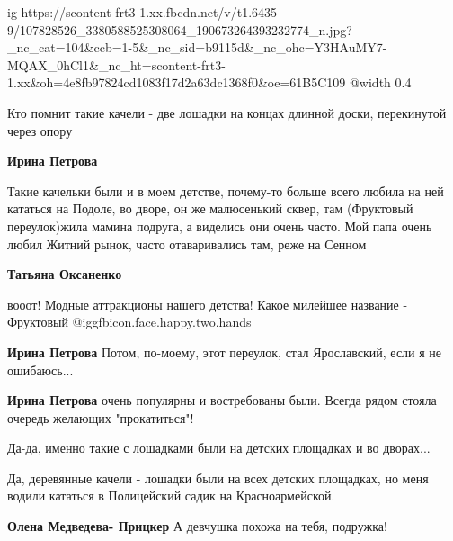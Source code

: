  
 
 
 
 

\ifcmt
  ig https://scontent-frt3-1.xx.fbcdn.net/v/t1.6435-9/107828526_3380588525308064_190673264393232774_n.jpg?_nc_cat=104&ccb=1-5&_nc_sid=b9115d&_nc_ohc=Y3HAuMY7-MQAX_0hCl1&_nc_ht=scontent-frt3-1.xx&oh=4e8fb97824cd1083f17d2a63dc1368f0&oe=61B5C109
  @width 0.4
\fi


Кто помнит такие качели - две лошадки на концах длинной доски, перекинутой
через опору

\textbf{Ирина Петрова} 

Такие качельки были и в моем детстве, почему-то больше всего любила на ней
кататься на Подоле, во дворе, он же малюсенький сквер, там (Фруктовый
переулок)жила мамина подруга, а виделись они очень часто. Мой папа очень любил
Житний рынок, часто отаваривались там, реже на Сенном

\textbf{Татьяна Оксаненко} 

вооот! Модные аттракционы нашего детства! Какое милейшее название - Фруктовый
@igg{fbicon.face.happy.two.hands} 

\textbf{Ирина Петрова} Потом, по-моему, этот переулок, стал Ярославский, если я не ошибаюсь...

\textbf{Ирина Петрова} очень популярны и востребованы были. Всегда рядом стояла очередь желающих "прокатиться"!

Да-да, именно такие с лошадками были на детских площадках и во дворах...


Да, деревянные качели - лошадки были на всех детских площадках, но меня водили
кататься в Полицейский садик на Красноармейской.

\textbf{Олена Медведева- Прицкер} А девчушка похожа на тебя, подружка!
